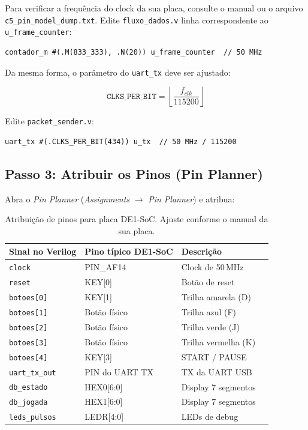 \documentclass[12pt,a4paper]{article}
\begin{document}
Para verificar a frequência do clock da sua placa, consulte o manual ou o arquivo \texttt{c5\_pin\_model\_dump.txt}. Edite \texttt{fluxo\_dados.v} linha correspondente ao \texttt{u\_frame\_counter}:

\begin{lstlisting}[style=verilog]
contador_m #(.M(833_333), .N(20)) u_frame_counter  // 50 MHz
\end{lstlisting}

Da mesma forma, o parâmetro do \texttt{uart\_tx} deve ser ajustado:

\begin{equation}
    \mathtt{CLKS\_PER\_BIT} = \left\lfloor \frac{f_{clk}}{115200} \right\rfloor
\end{equation}

Edite \texttt{packet\_sender.v}:
\begin{lstlisting}[style=verilog]
uart_tx #(.CLKS_PER_BIT(434)) u_tx  // 50 MHz / 115200
\end{lstlisting}

\subsection{Passo 3: Atribuir os Pinos (Pin Planner)}

Abra o \textit{Pin Planner} (\textit{Assignments} $\rightarrow$ \textit{Pin Planner}) e atribua:

\begin{table}[H]
\centering
\begin{tabular}{llll}
\toprule
\textbf{Sinal no Verilog} & \textbf{Pino típico DE1-SoC} & \textbf{Descrição} \\
\midrule
\texttt{clock}         & PIN\_AF14      & Clock de 50\,MHz \\
\texttt{reset}         & KEY[0]         & Botão de reset \\
\texttt{botoes[0]}     & KEY[1]         & Trilha amarela (D) \\
\texttt{botoes[1]}     & Botão físico   & Trilha azul (F) \\
\texttt{botoes[2]}     & Botão físico   & Trilha verde (J) \\
\texttt{botoes[3]}     & Botão físico   & Trilha vermelha (K) \\
\texttt{botoes[4]}     & KEY[3]         & START / PAUSE \\
\texttt{uart\_tx\_out} & PIN do UART TX & TX da UART USB \\
\texttt{db\_estado}    & HEX0[6:0]      & Display 7 segmentos \\
\texttt{db\_jogada}    & HEX1[6:0]      & Display 7 segmentos \\
\texttt{leds\_pulsos}  & LEDR[4:0]      & LEDs de debug \\
\bottomrule
\end{tabular}
\caption{Atribuição de pinos para placa DE1-SoC. Ajuste conforme o manual da sua placa.}
\end{table}
\end{document}
